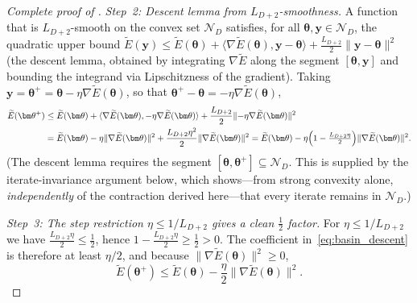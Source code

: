 \documentclass[11pt]{article}
\newcommand{\cN}{\mathcal{N}}
\theoremstyle{plain}
\theoremstyle{plain}
\begin{document}
\begin{proof}[Complete proof of ]
\emph{Step~2: Descent lemma from $L_{D+2}$-smoothness.}
A function that is $L_{D+2}$-smooth on the convex set $\cN_D$ satisfies,
for all $\bm\theta,\bm y\in\cN_D$, the quadratic upper bound
$\widetilde{E}(\bm y)\le\widetilde{E}(\bm\theta)
+\langle\nabla\widetilde{E}(\bm\theta),\bm y-\bm\theta\rangle
+\tfrac{L_{D+2}}{2}\|\bm y-\bm\theta\|^2$ (the descent lemma, obtained
by integrating $\nabla\widetilde{E}$ along the segment $[\bm\theta,\bm y]$
and bounding the integrand via Lipschitzness of the gradient).  Taking
$\bm y=\bm\theta^+=\bm\theta-\eta\nabla\widetilde{E}(\bm\theta)$, so that
$\bm\theta^+-\bm\theta=-\eta\nabla\widetilde{E}(\bm\theta)$,
\begin{align}
  \widetilde{E}(\bm\theta^+)
  &\le\widetilde{E}(\bm\theta)
  +\langle\nabla\widetilde{E}(\bm\theta),
  -\eta\nabla\widetilde{E}(\bm\theta)\rangle
  +\frac{L_{D+2}}{2}\|{-}\eta\nabla\widetilde{E}(\bm\theta)\|^2
  \notag\\
  &=\widetilde{E}(\bm\theta)
  -\eta\|\nabla\widetilde{E}(\bm\theta)\|^2
  +\frac{L_{D+2}\eta^2}{2}\|\nabla\widetilde{E}(\bm\theta)\|^2
  =\widetilde{E}(\bm\theta)
  -\eta\Bigl(1-\tfrac{L_{D+2}\eta}{2}\Bigr)
   \|\nabla\widetilde{E}(\bm\theta)\|^2 .
  \label{eq:basin_descent}
\end{align}
(The descent lemma requires the segment
$[\bm\theta,\bm\theta^+]\subseteq\cN_D$.  This is supplied by the
iterate-invariance argument below, which shows---from strong convexity
alone, \emph{independently} of the contraction derived here---that every
iterate remains in $\cN_D$.)

\emph{Step~3: The step restriction $\eta\le 1/L_{D+2}$ gives a clean
$\tfrac12$ factor.}
For $\eta\le 1/L_{D+2}$ we have
$\tfrac{L_{D+2}\eta}{2}\le\tfrac12$, hence
$1-\tfrac{L_{D+2}\eta}{2}\ge\tfrac12>0$.  The coefficient
in~\eqref{eq:basin_descent} is therefore at least $\eta/2$, and because
$\|\nabla\widetilde{E}(\bm\theta)\|^2\ge0$,
\begin{equation}\label{eq:basin_half}
  \widetilde{E}(\bm\theta^+)
  \le\widetilde{E}(\bm\theta)
  -\frac{\eta}{2}\|\nabla\widetilde{E}(\bm\theta)\|^2 .
\end{equation}


\end{proof}
\end{document}
